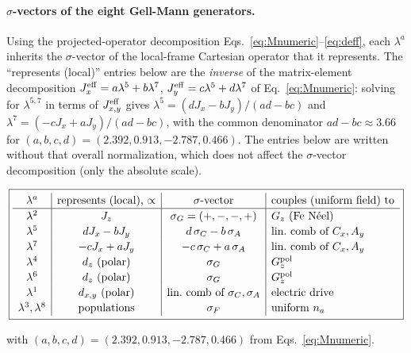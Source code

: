 \documentclass[reprint,amsmath,amssymb,aps,prb,longbibliography]{revtex4-2}
\newcommand{\fix}[1]{#1}
\begin{document}
\paragraph{$\sigma$-vectors of the eight Gell-Mann generators.}
Using the projected-operator decomposition
Eqs.~\eqref{eq:Mnumeric}--\eqref{eq:deff}, each $\lambda^a$ inherits
the $\sigma$-vector of the local-frame Cartesian operator that it
represents. \fix{The ``represents (local)'' entries below are the
\emph{inverse} of the matrix-element decomposition
$J_x^{\rm eff} = a\lambda^5 + b\lambda^7$,
$J_y^{\rm eff} = c\lambda^5 + d\lambda^7$ of
Eq.~\eqref{eq:Mnumeric}: solving for $\lambda^{5,7}$ in terms of
$J_{x,y}^{\rm eff}$ gives $\lambda^5 = (dJ_x - bJ_y)/(ad-bc)$ and
$\lambda^7 = (-cJ_x + aJ_y)/(ad-bc)$, with the common denominator
$ad-bc \approx 3.66$ for $(a,b,c,d)=(2.392,0.913,-2.787,0.466)$. The
entries below are written without that overall normalization, which
does not affect the $\sigma$-vector decomposition (only the absolute
scale).}
\begin{widetext}
\begin{equation}
\boxed{
\renewcommand{\arraystretch}{1.15}
\begin{array}{c|c|c|l}
\lambda^a & \text{represents (local), $\propto$} & \sigma\text{-vector} & \text{couples (uniform field) to}\\
\hline
\lambda^2 & J_z & \sigma_G=(+,-,-,+) & G_z\text{ (Fe N\'eel)}\\
\lambda^5 & d J_x - b J_y & d\,\sigma_C - b\,\sigma_A & \text{lin.\ comb of } C_x, A_y\\
\lambda^7 & -c J_x + a J_y & -c\,\sigma_C + a\,\sigma_A & \text{lin.\ comb of } C_x, A_y\\
\lambda^4 & d_z\text{ (polar)} & \sigma_G & G_z^{\rm pol}\\
\lambda^6 & d_z\text{ (polar)} & \sigma_G & G_z^{\rm pol}\\
\lambda^1 & d_{x,y}\text{ (polar)} & \text{lin.\ comb of }\sigma_C,\sigma_A & \text{electric drive}\\
\lambda^3,\lambda^8 & \text{populations} & \sigma_F & \text{uniform } n_a\\
\end{array}}
\label{eq:LambdaBertaut}
\end{equation}
\end{widetext}
with $(a,b,c,d)=(2.392, 0.913,-2.787,0.466)$ from
Eqs.~\eqref{eq:Mnumeric}.
\end{document}
